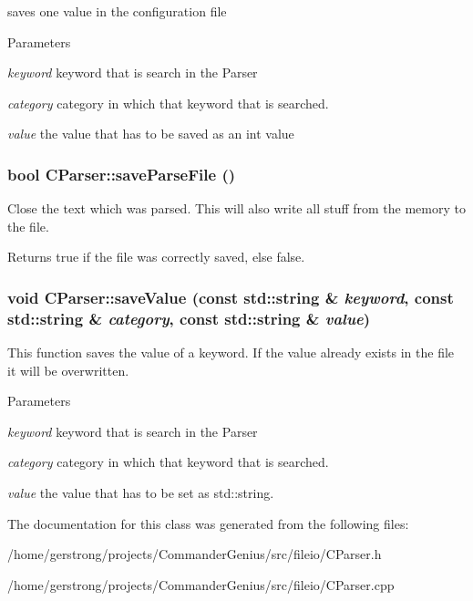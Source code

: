 saves one value in the configuration file 


\begin{DoxyParams}{Parameters}
\item[{\em keyword}]keyword that is search in the Parser \item[{\em category}]category in which that keyword that is searched. \item[{\em value}]the value that has to be saved as an int value \end{DoxyParams}
\hypertarget{class_c_parser_af67215748daabe83cd0682a443e2fe36}{
\subsubsection[{saveParseFile}]{\setlength{\rightskip}{0pt plus 5cm}bool CParser::saveParseFile ()}}
\label{class_c_parser_af67215748daabe83cd0682a443e2fe36}


Close the text which was parsed. This will also write all stuff from the memory to the file. 

\begin{DoxyReturn}{Returns}
true if the file was correctly saved, else false. 
\end{DoxyReturn}
\hypertarget{class_c_parser_ad6f32a86fd00603ffb347587ffbcb76b}{
\subsubsection[{saveValue}]{\setlength{\rightskip}{0pt plus 5cm}void CParser::saveValue (const std::string \& {\em keyword}, \/  const std::string \& {\em category}, \/  const std::string \& {\em value})}}
\label{class_c_parser_ad6f32a86fd00603ffb347587ffbcb76b}


This function saves the value of a keyword. If the value already exists in the file it will be overwritten. 


\begin{DoxyParams}{Parameters}
\item[{\em keyword}]keyword that is search in the Parser \item[{\em category}]category in which that keyword that is searched. \item[{\em value}]the value that has to be set as std::string. \end{DoxyParams}


The documentation for this class was generated from the following files:\begin{DoxyCompactItemize}
\item 
/home/gerstrong/projects/CommanderGenius/src/fileio/CParser.h\item 
/home/gerstrong/projects/CommanderGenius/src/fileio/CParser.cpp\end{DoxyCompactItemize}

